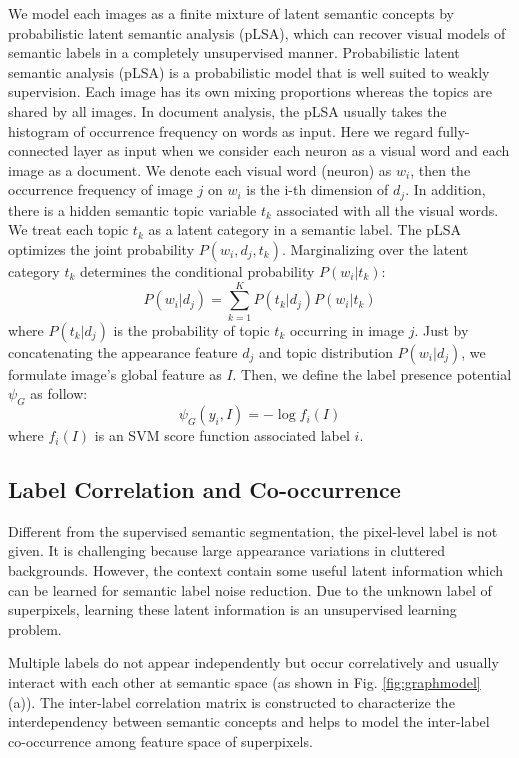 We model each images as a finite mixture of latent semantic concepts by probabilistic latent semantic analysis (pLSA), which can recover visual models of semantic labels  in a completely unsupervised manner. Probabilistic latent semantic analysis (pLSA) is a probabilistic model that is well suited to weakly supervision. Each image has its own mixing proportions whereas the topics are shared by all images. In document analysis, the pLSA usually takes the histogram of occurrence frequency on words as input. Here we regard fully-connected layer as input when we consider each neuron as a visual word and each image as a document. We denote each visual word (neuron) as $w_i$, then the occurrence frequency of image $j$ on $w_i$ is the i-th dimension of $d_j$. In addition, there is a hidden semantic topic variable $t_k$ associated with all the visual words. We treat each topic $t_k$ as a latent category in a semantic label. The pLSA optimizes the joint probability $P(w_i,d_j,t_k)$. Marginalizing over the latent category $t_k$ determines the conditional probability $P(w_i|t_k)$:
\begin{equation}
  P(w_i|d_j) = \sum_{k=1}^K{P(t_k|d_j)P(w_i|t_k)}
\end{equation}
where $P(t_k|d_j)$ is the probability of topic $t_k$ occurring in image $j$.
Just by concatenating the appearance feature $d_j$ and topic distribution $P(w_i|d_j)$, we formulate image's global feature as $I$. Then, we define the label presence potential $\psi_{G}$ as follow:
\begin{equation}
    \psi_{G}(y_i,I) = -\log f_{i}(I)
\end{equation}
where $f_{i}(I)$ is an SVM score function associated label $i$. 

\subsection{Label Correlation and Co-occurrence}

Different from the supervised semantic segmentation, the pixel-level label is not given. It is challenging because large appearance variations in cluttered backgrounds. However, the context contain some useful latent information which can be learned for semantic label noise reduction. Due to the unknown label of superpixels, learning these latent information is an unsupervised learning problem. 

Multiple labels do not appear independently but occur correlatively and usually interact with each other at semantic space (as shown in Fig. \ref{fig:graphmodel} (a)). The inter-label correlation matrix is constructed to characterize the interdependency between semantic concepts and helps to model the inter-label co-occurrence among feature space of superpixels.


